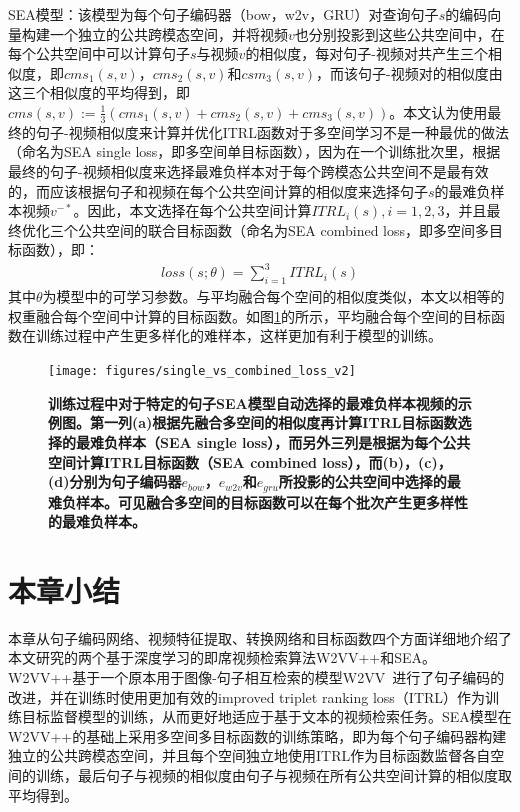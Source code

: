 SEA模型：该模型为每个句子编码器（bow，w2v，GRU）对查询句子$s$的编码向量构建一个独立的公共跨模态空间，并将视频$v$也分别投影到这些公共空间中，在每个公共空间中可以计算句子$s$与视频$v$的相似度，每对句子-视频对共产生三个相似度，即$cms_1(s,v)$，$cms_2(s,v)$和$csm_3(s,v)$，而该句子-视频对的相似度由这三个相似度的平均得到，即$cms(s,v):=\frac{1}{3}(cms_1(s,v)+cms_2(s,v)+cms_3(s,v))$。本文认为使用最终的句子-视频相似度来计算并优化ITRL函数对于多空间学习不是一种最优的做法（命名为SEA single loss，即多空间单目标函数），因为在一个训练批次里，根据最终的句子-视频相似度来选择最难负样本对于每个跨模态公共空间不是最有效的，而应该根据句子和视频在每个公共空间计算的相似度来选择句子$s$的最难负样本视频$v^{-*}$。因此，本文选择在每个公共空间计算$ITRL_i(s), i=1,2,3$，并且最终优化三个公共空间的联合目标函数（命名为SEA combined loss，即多空间多目标函数），即：
\begin{equation}
    \label{eq:loss-sea}
    \begin{aligned}
        loss(s;\theta) = \sum_{i=1}^3 ITRL_i(s)
    \end{aligned}
\end{equation}
其中$\theta$为模型中的可学习参数。与平均融合每个空间的相似度类似，本文以相等的权重融合每个空间中计算的目标函数。如图\ref{fig:negative-examples}的所示，平均融合每个空间的目标函数在训练过程中产生更多样化的难样本，这样更加有利于模型的训练。

\begin{figure}[tbh!]
    \centering
    \texttt{[image: figures/single\_vs\_combined\_loss\_v2]}
    \caption[训练过程中对于特定的句子SEA模型自动选择的最难负样本视频的示例图]{\bfseries{训练过程中对于特定的句子SEA模型自动选择的最难负样本视频的示例图。第一列(a)根据先融合多空间的相似度再计算ITRL目标函数选择的最难负样本（SEA single loss），而另外三列是根据为每个公共空间计算ITRL目标函数（SEA combined loss），而(b)，(c)，(d)分别为句子编码器$e_{bow}$，$e_{w2v}$和$e_{gru}$所投影的公共空间中选择的最难负样本。可见融合多空间的目标函数可以在每个批次产生更多样性的最难负样本。}}
    \label{fig:negative-examples}
\end{figure}

\section{本章小结}
本章从句子编码网络、视频特征提取、转换网络和目标函数四个方面详细地介绍了本文研究的两个基于深度学习的即席视频检索算法W2VV++和SEA。W2VV++基于一个原本用于图像-句子相互检索的模型W2VV~\cite{dong2018predicting}进行了句子编码的改进，并在训练时使用更加有效的improved triplet ranking loss（ITRL）作为训练目标监督模型的训练，从而更好地适应于基于文本的视频检索任务。SEA模型在W2VV++的基础上采用多空间多目标函数的训练策略，即为每个句子编码器构建独立的公共跨模态空间，并且每个空间独立地使用ITRL作为目标函数监督各自空间的训练，最后句子与视频的相似度由句子与视频在所有公共空间计算的相似度取平均得到。

